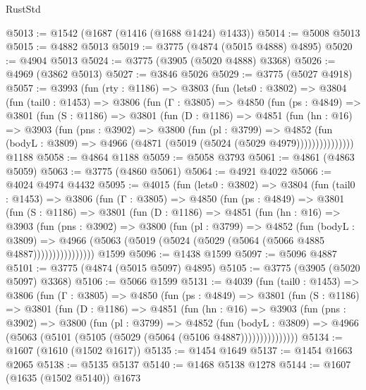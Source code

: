 \begin{lexlean}{RustStd}
\begin{coremodule}
@5013 := @1542 (@1687 (@1416 (@1688 @1424) @1433))
@5014 := @5008 @5013
@5015 := @4882 @5013
@5019 := @3775 (@4874 (@5015 @4888) @4895)
@5020 := @4904 @5013
@5024 := @3775 (@3905 (@5020 @4888) @3368)
@5026 := @4969 (@3862 @5013)
@5027 := @3846 @5026
@5029 := @3775 (@5027 @4918)
@5057 := @3993
    (fun (rty : @1186) =>
    @3803
      (fun (lets0 : @3802) =>
      @3804
        (fun (tail0 : @1453) =>
        @3806
          (fun (Γ : @3805) =>
          @4850
            (fun (ps : @4849) =>
            @3801
              (fun (S : @1186) =>
              @3801
                (fun (D : @1186) =>
                @4851
                  (fun (hn : @16) =>
                  @3903
                    (fun (pns : @3902) =>
                    @3800
                      (fun (pl : @3799) =>
                      @4852
                        (fun (bodyL : @3809) =>
                        @4966 (@4871 (@5019 (@5024 (@5029 @4979)))))))))))))))
    @1188
@5058 := @4864 @1188
@5059 := @5058 @3793
@5061 := @4861 (@4863 @5059)
@5063 := @3775 (@4860 @5061)
@5064 := @4921 @4022
@5066 := @4024 @4974 @4432
@5095 := @4015
    (fun (lets0 : @3802) =>
    @3804
      (fun (tail0 : @1453) =>
      @3806
        (fun (Γ : @3805) =>
        @4850
          (fun (ps : @4849) =>
          @3801
            (fun (S : @1186) =>
            @3801
              (fun (D : @1186) =>
              @4851
                (fun (hn : @16) =>
                @3903
                  (fun (pns : @3902) =>
                  @3800
                    (fun (pl : @3799) =>
                    @4852
                      (fun (bodyL : @3809) =>
                      @4966 (@5063 (@5019 (@5024 (@5029 (@5064 (@5066 @4885 @4887))))))))))))))))
    @1599
@5096 := @1438 @1599
@5097 := @5096 @4887
@5101 := @3775 (@4874 (@5015 @5097) @4895)
@5105 := @3775 (@3905 (@5020 @5097) @3368)
@5106 := @5066 @1599
@5131 := @4039
    (fun (tail0 : @1453) =>
    @3806
      (fun (Γ : @3805) =>
      @4850
        (fun (ps : @4849) =>
        @3801
          (fun (S : @1186) =>
          @3801
            (fun (D : @1186) =>
            @4851
              (fun (hn : @16) =>
              @3903
                (fun (pns : @3902) =>
                @3800
                  (fun (pl : @3799) =>
                  @4852
                    (fun (bodyL : @3809) =>
                    @4966 (@5063 (@5101 (@5105 (@5029 (@5064 (@5106 @4887)))))))))))))))
@5134 := @1607 (@1610 (@1502 @1617))
@5135 := @1454 @1649
@5137 := @1454 @1663 @2065
@5138 := @5135 @5137
@5140 := @1468 @5138 @1278
@5144 := @1607 (@1635 (@1502 @5140)) @1673

\end{coremodule}
\end{lexlean}
